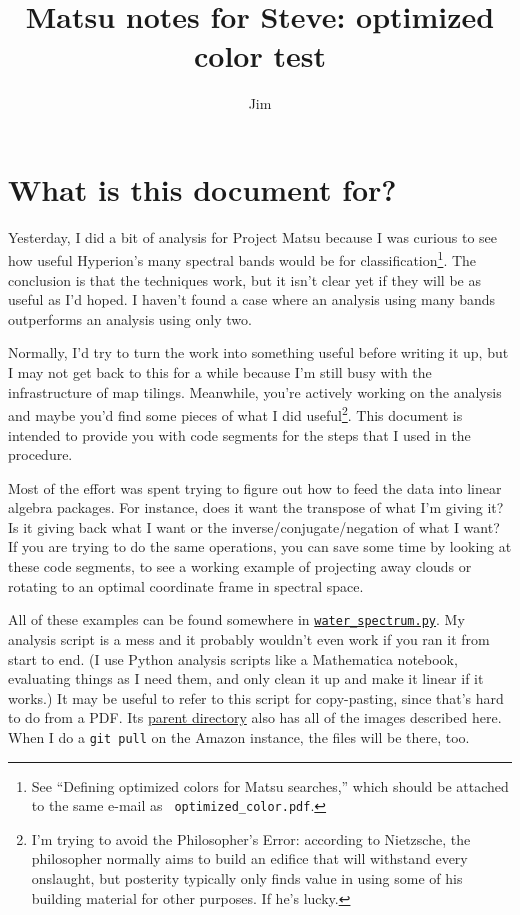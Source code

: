 \documentclass[12pt]{article}
\title{Matsu notes for Steve: optimized color test}
\author{Jim}
\begin{document}
\maketitle

\section{What is this document for?}

Yesterday, I did a bit of analysis for Project Matsu because I was
curious to see how useful Hyperion's many spectral bands would be for
classification\footnote{See ``Defining optimized colors for Matsu
  searches,'' which should be attached to the same e-mail as {\tt
    optimized\_color.pdf}.}.  The conclusion is that the techniques
work, but it isn't clear yet if they will be as useful as I'd hoped.  I
haven't found a case where an analysis using many bands outperforms an
analysis using only two.

Normally, I'd try to turn the work into something useful before writing it
up, but I may not get back to this for a while because I'm still
busy with the infrastructure of map tilings.  Meanwhile, you're
actively working on the analysis and maybe you'd find some pieces of
what I did useful\footnote{I'm trying to avoid the Philosopher's Error:
  according to Nietzsche, the philosopher normally aims to build an
  edifice that will withstand every onslaught, but posterity typically
  only finds value in using some of his building material for other
  purposes.  If he's lucky.}.  This document is intended to
provide you with code segments for the steps that I used in the
procedure.

Most of the effort was spent trying to figure
out how to feed the data into linear algebra packages.  For instance,
does it want the transpose of what I'm giving it?  Is it giving back
what I want or the inverse/conjugate/negation of what I want?  If you
are trying to do the same operations, you can save some time by
looking at these code segments, to see a working example of projecting
away clouds or rotating to an optimal coordinate frame in spectral
space.

All of these examples can be found somewhere in \href{https://github.com/jpivarski/matsu-project/blob/master/Analytics/Water%20and%20Boats/water_spectrum.py}{\tt water\_spectrum.py}.
My analysis script is a mess and it probably wouldn't even work if
you ran it from start to end.  (I use Python analysis scripts like a
Mathematica notebook, evaluating things as I need them, and only clean
it up and make it linear if it works.)  It may be useful to refer to this script for
copy-pasting, since that's hard to do from a PDF.  Its \href{https://github.com/jpivarski/matsu-project/tree/master/Analytics/Water%20and%20Boats}{parent directory}
also has all of the images described here.  When I do a {\tt git pull}
on the Amazon instance, the files will be there, too.
\end{document}
